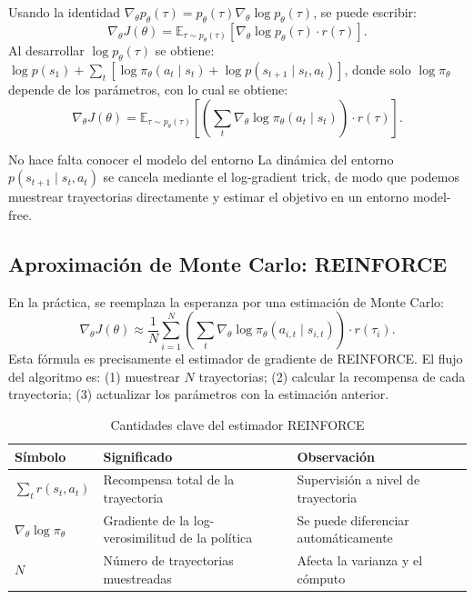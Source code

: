 \documentclass[a4paper]{article}
\begin{document}
Usando la identidad $\nabla_\theta p_\theta(\tau) = p_\theta(\tau) \nabla_\theta \log p_\theta(\tau)$, se puede escribir:
$$\nabla_\theta J(\theta) = \mathbb{E}_{\tau \sim p_\theta(\tau)} \left[ \nabla_\theta \log p_\theta(\tau) \cdot r(\tau) \right].$$
Al desarrollar $\log p_\theta(\tau)$ se obtiene: $\log p(s_1) + \sum_t \left[\log \pi_\theta(a_t\mid s_t) + \log p(s_{t+1}\mid s_t,a_t)\right]$,
donde solo $\log \pi_\theta$ depende de los parámetros, con lo cual se obtiene:
$$\nabla_\theta J(\theta) = \mathbb{E}_{\tau \sim p_\theta(\tau)} \left[ \left(\sum_t \nabla_\theta \log \pi_\theta(a_t\mid s_t)\right) \cdot r(\tau) \right].$$

\begin{importantbox}{No hace falta conocer el modelo del entorno}
La dinámica del entorno $p(s_{t+1}\mid s_t,a_t)$ se cancela mediante el log-gradient trick, de modo que podemos muestrear trayectorias directamente y estimar el objetivo en un entorno model-free.
\end{importantbox}

\subsection{Aproximación de Monte Carlo: REINFORCE}

En la práctica, se reemplaza la esperanza por una estimación de Monte Carlo:
$$\nabla_\theta J(\theta) \approx \frac{1}{N} \sum_{i=1}^{N} \left(\sum_t \nabla_\theta \log \pi_\theta(a_{i,t}\mid s_{i,t})\right) \cdot r(\tau_i).$$
Esta fórmula es precisamente el estimador de gradiente de REINFORCE. El flujo del algoritmo es: (1) muestrear $N$ trayectorias; (2) calcular la recompensa de cada trayectoria; (3) actualizar los parámetros con la estimación anterior.

\begin{table}[H]
\centering
\small
\begin{tabular}{p{}p{}p{}}
\toprule
Símbolo & Significado & Observación \\
\midrule
$\sum_t r(s_t,a_t)$ & Recompensa total de la trayectoria & Supervisión a nivel de trayectoria \\
$\nabla_\theta \log \pi_\theta$ & Gradiente de la log-verosimilitud de la política & Se puede diferenciar automáticamente \\
$N$ & Número de trayectorias muestreadas & Afecta la varianza y el cómputo \\
\bottomrule
\end{tabular}
\caption{Cantidades clave del estimador REINFORCE}
\end{table}
\end{document}
